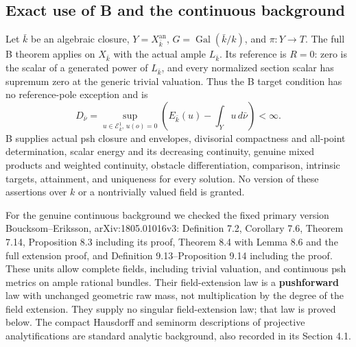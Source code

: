 \documentclass[
  11pt,
]{article}
\begin{document}
\subsection{Exact use of B and the continuous
background}\label{exact-use-of-b-and-the-continuous-background}

Let \(\bar k\) be an algebraic closure, \(Y=X_{\bar k}^{\mathrm{an}}\),
\(G=\operatorname{Gal}(\bar k/k)\), and \(\pi:Y\to T\). The full B
theorem applies on \(X_{\bar k}\) with the actual ample \(L_{\bar k}\).
Its reference is \(R=0\): zero is the scalar of a generated power of
\(L_{\bar k}\), and every normalized section scalar has supremum zero at
the generic trivial valuation. Thus the B target condition has no
reference-pole exception and is \[
 D_{\bar\nu}=\sup_{u\in\mathcal E^1_{\bar k},\,u(o)=0}
       \left(E_{\bar k}(u)-\int_Yu\,d\bar\nu\right)<\infty.
 \tag{4}
\] B supplies actual psh closure and envelopes, divisorial compactness
and all-point determination, scalar energy and its decreasing
continuity, genuine mixed products and weighted continuity, obstacle
differentiation, comparison, intrinsic targets, attainment, and
uniqueness for every solution. No version of these assertions over \(k\)
or a nontrivially valued field is granted.

For the genuine continuous background we checked the fixed primary
version Boucksom--Eriksson, arXiv:1805.01016v3: Definition 7.2,
Corollary 7.6, Theorem 7.14, Proposition 8.3 including its proof,
Theorem 8.4 with Lemma 8.6 and the full extension proof, and Definition
9.13--Proposition 9.14 including the proof. These units allow complete
fields, including trivial valuation, and continuous psh metrics on ample
rational bundles. Their field-extension law is a \textbf{pushforward}
law with unchanged geometric raw mass, not multiplication by the degree
of the field extension. They supply no singular field-extension law;
that law is proved below. The compact Hausdorff and seminorm
descriptions of projective analytifications are standard analytic
background, also recorded in its Section 4.1.
\end{document}
